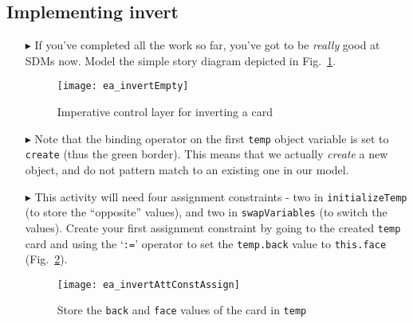 \newpage
\hypertarget{invertCard vis}{}
\subsection{Implementing invert}
\genHeader

\begin{itemize}

\vspace{0.5cm}

\item[$\blacktriangleright$] If you've completed all the work so far, you've got to be \emph{really} good at SDMs now. Model the simple story diagram
depicted in Fig.~\ref{ea:sdm_invertEmpty}.

\vspace{0.5cm}

\begin{figure}[htbp]
\begin{center}
  \texttt{[image: ea\_invertEmpty]}
  \caption{Imperative control layer for inverting a card}  
  \label{ea:sdm_invertEmpty}
\end{center}
\end{figure}

\item[$\blacktriangleright$] Note that the binding operator on the first \texttt{temp} object variable is set to \texttt{create} (thus the green
border). This means that we actually \emph{create} a new object, and do not pattern match to an existing one in our model.

\item[$\blacktriangleright$] This activity will need four assignment constraints - two in \texttt{in\-it\-ia\-lize\-Temp} (to store the ``opposite'' values),
and two in \texttt{swapVariables} (to switch the values). Create your first assignment constraint by going to the created \texttt{temp} card and using the
`\texttt{:=}' operator to set the \texttt{temp.back} value to \texttt{this.face} (Fig.~\ref{ea:sdm_invertAssignment}).

\begin{figure}[htbp]
\begin{center}
  \texttt{[image: ea\_invertAttConstAssign]}
  \caption{Store the \texttt{back} and \texttt{face} values of the card in \texttt{temp}}  
  \label{ea:sdm_invertAssignment}
\end{center}
\end{figure}

\clearpage


\end{itemize}
